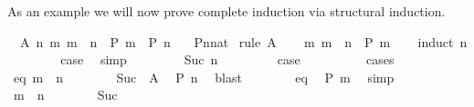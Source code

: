 \begin{isabellebody}
\begin{isamarkuptext}
As an example we will now prove complete induction via
structural induction.%
\end{isamarkuptext}%
\isamarkupfalse%
\ \ A{\isacharcolon}\ {\isachardoublequote}{\isacharparenleft}{\isasymAnd}n{\isachardot}\ {\isacharparenleft}{\isasymAnd}m{\isachardot}\ m\ {\isacharless}\ n\ {\isasymLongrightarrow}\ P\ m{\isacharparenright}\ {\isasymLongrightarrow}\ P\ n{\isacharparenright}{\isachardoublequote}\isanewline
\ \ \ {\isachardoublequote}P{\isacharparenleft}n{\isacharcolon}{\isacharcolon}nat{\isacharparenright}{\isachardoublequote}\isanewline
%
\isadelimproof
%
\endisadelimproof
%
\isatagproof
\isamarkupfalse%
\ {\isacharparenleft}rule\ A{\isacharparenright}\isanewline
\ \ \isamarkupfalse%
\ {\isachardoublequote}{\isasymAnd}m{\isachardot}\ m\ {\isacharless}\ n\ {\isasymLongrightarrow}\ P\ m{\isachardoublequote}\isanewline
\ \ \isamarkupfalse%
\ {\isacharparenleft}induct\ n{\isacharparenright}\isanewline
\ \ \ \ \isamarkupfalse%
\ {}\ \isamarkupfalse%
\ {\isacharquery}case\ \isamarkupfalse%
\ simp\isanewline
\ \ \isamarkupfalse%
\isanewline
\ \ \ \ \isamarkupfalse%
\ {\isacharparenleft}Suc\ n{\isacharparenright}\ \ \ %
\isanewline
\ \ \ \ \isamarkupfalse%
\ {\isacharquery}case\ \ \ \ %
\isanewline
\ \ \ \ \isamarkupfalse%
\ cases\isanewline
\ \ \ \ \ \ \isamarkupfalse%
\ eq{\isacharcolon}\ {\isachardoublequote}m\ {\isacharequal}\ n{\isachardoublequote}\isanewline
\ \ \ \ \ \ \isamarkupfalse%
\ Suc\ \ A\ \isamarkupfalse%
\ {\isachardoublequote}P\ n{\isachardoublequote}\ \isamarkupfalse%
\ blast\isanewline
\ \ \ \ \ \ \isamarkupfalse%
\ eq\ \isamarkupfalse%
\ {\isachardoublequote}P\ m{\isachardoublequote}\ \isamarkupfalse%
\ simp\isanewline
\ \ \ \ \isamarkupfalse%
\isanewline
\ \ \ \ \ \ \isamarkupfalse%
\ {\isachardoublequote}m\ {\isasymnoteq}\ n{\isachardoublequote}\isanewline
\ \ \ \ \ \ \isamarkupfalse%
\ Suc\ \isamarkupfalse%

\end{isabellebody}
